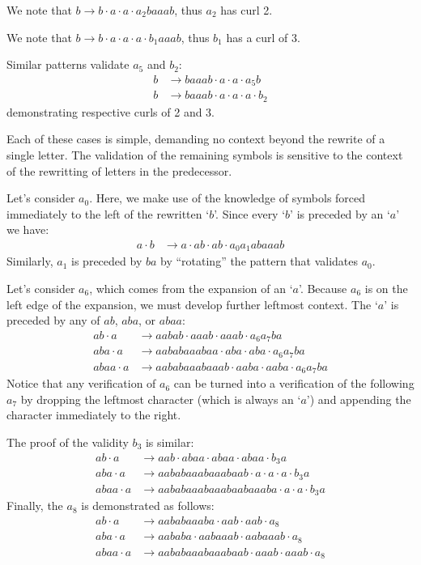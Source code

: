\documentclass[11pt]{article}
\def\ni{\noindent}
\def\q#1{`$#1$'}
\begin{document}
\ni {Case $a_2$.} We note that $b\rightarrow b\cdot a\cdot a\cdot a_2baaab$, thus $a_2$ has curl 2.

\ni{Case $b_1$.}  We note that $b\rightarrow b\cdot a\cdot a\cdot a\cdot b_1aaab$, thus $b_1$ has a curl of 3.

\ni{Case $a_5$.} Similar patterns validate $a_5$ and $b_2$:
\begin{align*}
b&\rightarrow baaab\cdot a \cdot a \cdot a_5b\\
b&\rightarrow baaab\cdot a \cdot a \cdot a\cdot b_2
\end{align*}
\ni demonstrating respective curls of 2 and 3.

\ni Each of these cases is simple, demanding no context beyond the rewrite of a single letter. The validation of the remaining symbols is sensitive to the context of the rewritting of letters in the predecessor.

Let's consider $a_0$.  Here, we make use of the knowledge of symbols forced immediately
to the left of the rewritten \q{b}.  Since every \q{b} is preceded by an \q{a} we have:
\begin{align*}
a\cdot b&\rightarrow a\cdot ab\cdot ab\cdot a_0a_1abaaab
\end{align*}
Similarly, $a_1$ is preceded by $ba$ by ``rotating'' the pattern that
validates $a_0$.

Let's consider $a_6$, which comes from the expansion of an \q{a}. Because
$a_6$ is on the left edge of the expansion, we must develop further leftmost
context.  The \q{a} is preceded by any of $ab$, $aba$, or $abaa$:
\begin{align*}
ab\cdot a&\rightarrow aabab\cdot aaab\cdot aaab\cdot a_6a_7ba\\
aba\cdot a&\rightarrow aababaaabaa\cdot aba \cdot aba\cdot a_6a_7ba\\
abaa\cdot a&\rightarrow aababaaabaaab\cdot aaba\cdot aaba\cdot a_6a_7ba
\end{align*}
\ni Notice that any verification of $a_6$ can be turned into a verification
of the following $a_7$ by dropping the leftmost character (which is always
an \q{a}) and appending the character immediately to the right.  

The proof
of the validity $b_3$ is similar:
\begin{align*}
ab\cdot a&\rightarrow aab\cdot abaa\cdot abaa\cdot abaa\cdot b_3a\\
aba\cdot a&\rightarrow aababaaabaaabaab\cdot a\cdot a\cdot a\cdot b_3a\\
abaa\cdot a&\rightarrow aababaaabaaabaabaaaba\cdot a\cdot a\cdot b_3a
\end{align*}
\ni Finally, the $a_8$ is demonstrated as follows:
\begin{align*}
ab\cdot a&\rightarrow aababaaaba\cdot aab\cdot aab\cdot a_8\\
aba\cdot a&\rightarrow aababa\cdot aabaaab\cdot aabaaab\cdot a_8\\
abaa\cdot a&\rightarrow aababaaabaaabaab\cdot aaab\cdot aaab\cdot a_8
\end{align*}
\end{document}
